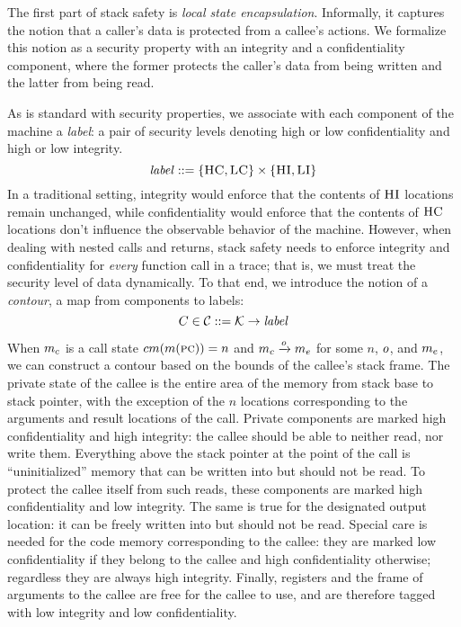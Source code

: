 \documentclass[acmsmall,review,anonymous]{acmart}\settopmatter{printfolios=true,printccs=false,printacmref=false}
\begin{document}
The first part of stack safety is {\em local state encapsulation}.
Informally, it captures the notion that a caller's data is
protected from a callee's actions. We formalize this notion
as a security property with an integrity and a confidentiality
component, where the former protects the caller's data from being
written and the latter from being read.

As is standard with security properties, we associate with each
component of the machine a {\em label}: a pair of security levels
denoting high or low confidentiality and high or low integrity.
%
\[\mathit{label} ::= \{\textsc{HC},\textsc{LC}\} \times \{\textsc{HI},\textsc{LI}\}\]
%
In a traditional setting, integrity would enforce that the contents of
$\textsc{HI}$ locations remain unchanged, while confidentiality would
enforce that the contents of $\textsc{HC}$ locations don't influence the
observable behavior of the machine. However, when dealing with nested
calls and returns, stack safety needs to enforce integrity and
confidentiality for {\em every} function call in a trace; that is, we
must treat the security level of data dynamically.
%
To that end, we introduce the notion of a {\em contour}, a map from
components to labels:
%
\[C \in {\mathcal C} ::= {\mathcal K} \rightarrow \mathit{label}\]

When \(m_c\) is a call state \(cm(m(\textsc{pc})) = n\) and
\(m_c \xrightarrow{o} m_e\) for some $n$, $o$, and
$m_e$, we can construct a contour based on the bounds of the
callee's stack frame.
%
The private state of the callee is the entire area of the memory from
stack base to stack pointer, with the exception of the $n$ locations
corresponding to the arguments and result locations of the
call. Private components are marked high confidentiality and high
integrity: the callee should be able to neither read, nor write them.
%
Everything above the stack pointer at the point of the call is
``uninitialized'' memory that can be written into but should not be
read. To protect the callee itself from such reads, these components
are marked high confidentiality and low integrity.
%
The same is true for the designated output location: it can be
freely written into but should not be read.
%
Special care is needed for the code memory corresponding to the
callee: they are marked low confidentiality if they belong to the
callee and high confidentiality otherwise; regardless they are always
high integrity.
%
Finally, registers and the frame of arguments to the callee are free
for the callee to use, and are therefore tagged with low integrity and
low confidentiality.
\end{document}
